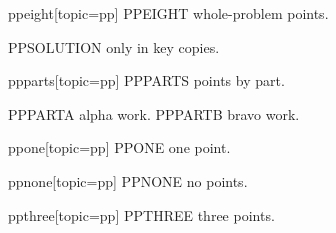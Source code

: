\begin{problem}{ppeight}[topic=pp]
	PPEIGHT whole-problem points.
	\begin{solution}
	PPSOLUTION only in key copies.
	\end{solution}
\end{problem}
\begin{problem}{ppparts}[topic=pp]
	PPPARTS points by part.
	\begin{parts}
		\ppart PPPARTA alpha work.
		\ppart PPPARTB bravo work.
	\end{parts}
\end{problem}
\begin{problem}{ppone}[topic=pp]
	PPONE one point.
\end{problem}
\begin{problem}{ppnone}[topic=pp]
	PPNONE no points.
\end{problem}
\begin{problem}{ppthree}[topic=pp]
	PPTHREE three points.
\end{problem}
